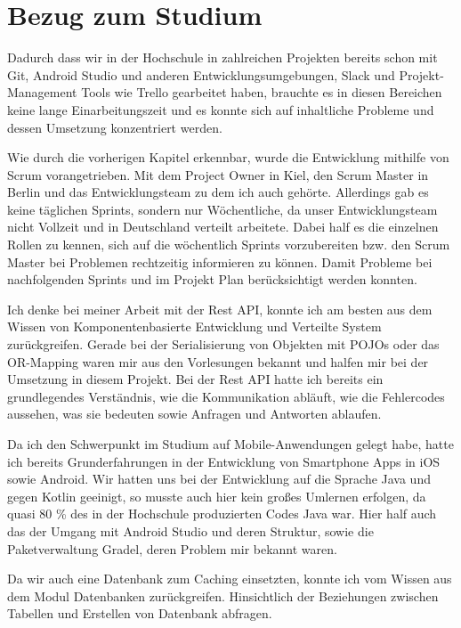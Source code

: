 \chapter{Bezug zum Studium}
Dadurch dass wir in der Hochschule in zahlreichen Projekten bereits schon mit Git, Android Studio und anderen Entwicklungsumgebungen, Slack und Projekt-Management Tools wie Trello gearbeitet haben, brauchte es in diesen Bereichen keine lange Einarbeitungszeit und es konnte sich auf inhaltliche Probleme und dessen Umsetzung konzentriert werden.

Wie durch die vorherigen Kapitel erkennbar, wurde die Entwicklung mithilfe von Scrum vorangetrieben. Mit dem Project Owner in Kiel, den Scrum Master in Berlin und das Entwicklungsteam zu dem ich auch gehörte. Allerdings gab es keine täglichen Sprints, sondern nur Wöchentliche, da unser Entwicklungsteam nicht Vollzeit und in Deutschland verteilt arbeitete. Dabei half es die einzelnen Rollen zu kennen, sich auf die wöchentlich Sprints vorzubereiten bzw. den Scrum Master bei Problemen rechtzeitig informieren zu können. Damit Probleme bei nachfolgenden Sprints und im Projekt Plan berücksichtigt werden konnten.  %


Ich denke bei meiner Arbeit mit der Rest API, konnte ich am besten aus dem Wissen von Komponentenbasierte Entwicklung und Verteilte System zurückgreifen. Gerade bei der Serialisierung von Objekten mit POJOs oder das OR-Mapping waren mir aus den Vorlesungen bekannt und halfen mir bei der Umsetzung in diesem Projekt. Bei der Rest API hatte ich bereits ein grundlegendes Verständnis, wie die Kommunikation abläuft, wie die Fehlercodes aussehen, was sie bedeuten sowie Anfragen und Antworten ablaufen.

Da ich den Schwerpunkt im Studium  auf Mobile-Anwendungen gelegt habe, hatte ich bereits Grunderfahrungen in der Entwicklung von Smartphone Apps in iOS sowie  Android. Wir hatten uns bei der Entwicklung auf die Sprache Java und gegen Kotlin geeinigt, so musste auch hier kein großes Umlernen erfolgen, da quasi 80 \% des in der Hochschule produzierten Codes Java war. Hier half auch das der Umgang mit Android Studio und deren Struktur, sowie die Paketverwaltung Gradel, deren Problem mir bekannt waren.

Da wir auch eine Datenbank zum Caching einsetzten, konnte ich vom Wissen aus dem Modul Datenbanken zurückgreifen. Hinsichtlich der Beziehungen zwischen Tabellen und Erstellen von Datenbank abfragen.

